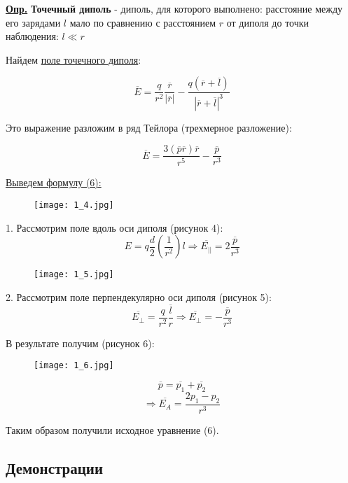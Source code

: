 \colorbox{faded}{\underline{\textbf{Опр.}}} \textbf{Точечный диполь} - диполь, для которого выполнено: расстояние между его зарядами $l$ мало по сравнению с расстоянием $r$ от диполя до точки наблюдения: $l \ll r$

Найдем \underline{поле точечного диполя}:

$$\overline{E} = \frac{q}{r^2} \frac{\overline{r}}{|\overline{r}|} - \frac{q(\overline{r} + \overline{l})}{|\overline{r} + \overline{l}|^3}$$

Это выражение разложим в ряд Тейлора (трехмерное разложение):

\begin{equation}\label{opr6}
\overline{E} = \frac{3(\overline{p} \overline{r}) \overline{r}}{r^5} - \frac{\overline{p}}{r^3}
\end{equation}

\underline{Выведем формулу (6):}

\begin{figure}[!ht]
\centering
 \texttt{[image: 1\_4.jpg]}     
 \label{fig:my_label}
 \caption{}
\end{figure}

1. Рассмотрим поле вдоль оси диполя (рисунок 4):
$$E = q \frac{d}{2} (\frac{1}{r^2}) l \Rightarrow \overline{E_{||}} = 2 \frac{\overline{p}}{r^3}$$

\begin{figure}[!ht]
\centering
 \texttt{[image: 1\_5.jpg]}     
 \label{fig:my_label}
 \caption{}
\end{figure}

2. Рассмотрим поле перпендекулярно оси диполя (рисунок 5):
$$\overline{E_{\perp}} =  \frac{q}{r^2} \frac{\overline{l}}{r}  \Rightarrow \overline{E_{\perp}} = - \frac{\overline{p}}{r^3}$$

В результате получим (рисунок 6):

\begin{figure}[!ht]
\centering
 \texttt{[image: 1\_6.jpg]}     
 \label{fig:my_label}
 \caption{}
\end{figure}

$$ \overline{p}  = \overline{p_{1}} + \overline{p_{2}}$$
$$\Rightarrow \overline{E_{A}} = \frac{2p_{1} - p_{2}}{r^3}$$

Таким образом получили исходное уравнение (6).

\subsection{Демонстрации}


